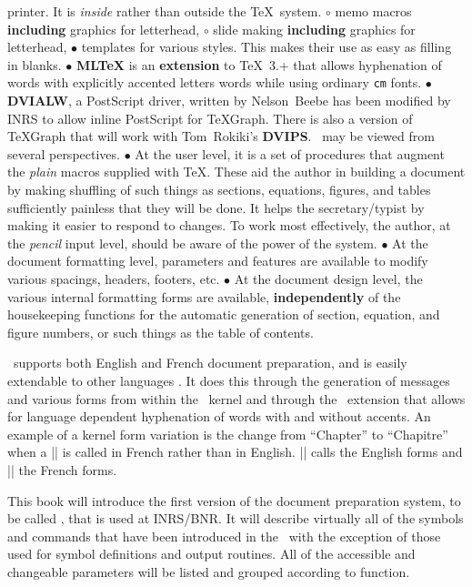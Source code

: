 printer. It is {\it inside} rather than outside the \TeX\ system.
\li $\circ$ memo macros {\bf including} graphics for letterhead, 
\li $\circ$ slide making {\bf including} graphics for letterhead, 
\endsublist
\li $\bullet$ templates for various styles. This makes their use as easy as
filling in blanks. 
\li $\bullet$ {\bf MLTeX} is an {\bf extension} to \TeX\ 3.+ that
allows hyphenation of words with explicitly accented letters 
words while using ordinary {\tt cm} fonts.
\li $\bullet$ {\bf DVIALW}, a PostScript driver, written by Nelson~Beebe 
has been modified by INRS to allow inline PostScript for \TeX Graph.
There is also a version of \TeX Graph that will work with 
Tom~Rokiki's {\bf DVIPS}. 
\endlist
\noindent
\intex\ may be viewed from several perspectives. 
\beginlist
\li $\bullet$ At the user level, it is a
set of procedures that augment the {\it plain} macros supplied with \TeX.
These aid the author in building  a document by making shuffling of such
things as sections, equations, figures, and tables sufficiently painless that
they will be done. It helps the secretary/typist by making it easier to
respond to changes. To work most effectively, the author, at the
{\it pencil} input level, should be aware of the power of the system. 
\li $\bullet$ At the document formatting level, parameters and features are
available to modify various spacings, headers, footers, etc. 
\li $\bullet$ At the document design level, the various internal formatting
forms are available, {\bf independently} of the housekeeping functions for the
automatic generation of section, equation, and figure numbers, or such things
as the table of contents. 
\endlist

\intex\   supports  both English and French document preparation,
and is easily extendable to other languages . It does this through
the generation of messages and various forms from within the \intex\ kernel
and through the \mtex\ extension that allows for language dependent hyphenation
of words with and without accents. An example of a kernel form variation is the
change from ``Chapter'' to ``Chapitre'' when a |\chapterhead| is called in
French rather than in English. |\englishversion| calls the English forms and
|\versionfrancaise| the French forms. 


This book will introduce the first version of the document preparation
system, to be called \intex, that is used at INRS/BNR. 
It will describe virtually all of the symbols and
commands that have been introduced in the \texbook\ with the exception of
those used for symbol definitions and output routines. All of the accessible
and changeable parameters will be listed and grouped according to function.

